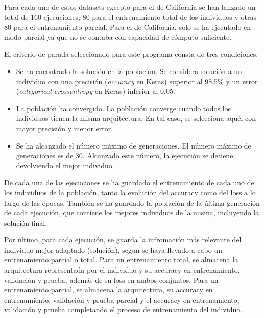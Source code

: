 \documentclass[spanish,a4paper,12pt,twoside]{report}
\begin{document}
  Para cada uno de estos datasets excepto para el de California se han lanzado un total de 160 ejecuciones; 80 para el entrenamiento total de los individuos y otras 80 para el entrenamiento parcial. Para el de California, solo se ha ejecutado en modo parcial ya que no se contaba con capacidad de cómputo suficiente. \par
  El criterio de parada seleccionado para este programa consta de tres condiciones: \par
  \begin{itemize}
    \item Se ha encontrado la solución en la población. Se considera solución a un individuo con una precisión (\emph{accuracy} en Keras) superior al 98,5\% y un error (\emph{categorical crossentropy} en Keras) inferior al 0.05.
    \item La población ha convergido. La población converge cuando todos los individuos tienen la misma arquitectura. En tal caso, se selecciona aquél con mayor precisión y menor error.
    \item Se ha alcanzado el número máximo de generaciones. El número máximo de generaciones es de 30. Alcanzado este número, la ejecución se detiene, devolviendo el mejor individuo.
  \end{itemize}
  De cada una de las ejecuciones se ha guardado el entrenamiento de cada uno de los individuos de la población, tanto la evolución del accuracy como del loss a lo largo de las épocas. También se ha guardado la población de la última generación de cada ejecución, que contiene los mejores individuos de la misma, incluyendo la solución final. \par
  Por último, para cada ejecución, se guarda la infromación más relevante del individuo mejor adaptado (solución), segun se haya llevado a cabo un entrenamiento parcial o total. Para un entrenamiento total, se almacena la arquitectura representada por el individuo y su accuracy en entrenamiento, validación y prueba, además de su loss en ambos conjuntos. Para un entrenamiento parcial, se almacena la arquitectura, su accuracy en entrenamiento, validación y prueba parcial y el accuracy en entrenamiento, validación y prueba completando el proceso de entrenamiento del individuo. \par
\end{document}
